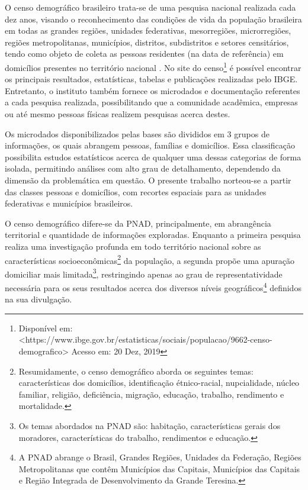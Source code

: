 O censo demográfico brasileiro trata-se de uma pesquisa nacional realizada cada dez anos, visando o reconhecimento das condições de vida da população brasileira em todas as grandes regiões, unidades federativas, mesorregiões, microrregiões, regiões metropolitanas, municípios, distritos, subdistritos e setores censitários, tendo como objeto de coleta as pessoas residentes (na data de referência) em domicílios presentes no território nacional \cite{cap04_ref14}. No site do censo\footnote{Disponível em: <https://www.ibge.gov.br/estatisticas/sociais/populacao/9662-censo-demografico> Acesso em: 20 Dez, 2019} é possível encontrar os principais resultados, estatísticas, tabelas e publicações realizadas pelo IBGE. Entretanto, o instituto também fornece os microdados e documentação referentes a cada pesquisa realizada, possibilitando que a comunidade acadêmica, empresas ou até mesmo pessoas físicas realizem pesquisas acerca destes. 

Os microdados disponibilizados pelas bases são divididos em 3 grupos de informações, os quais abrangem pessoas, famílias e domicílios. Essa classificação possibilita estudos estatísticos acerca de qualquer uma dessas categorias de forma isolada, permitindo análises com alto grau de detalhamento, dependendo da dimensão da problemática em questão. O presente trabalho norteou-se a partir das classes pessoas e domicílios, com recortes espaciais para as unidades federativas e municípios brasileiros. 

O censo demográfico difere-se da PNAD, principalmente, em abrangência territorial e quantidade de informações exploradas. Enquanto a primeira pesquisa realiza uma investigação profunda em todo território nacional sobre as características socioeconômicas\footnote{Resumidamente, o censo demográfico aborda os seguintes temas: características dos domicílios, identificação étnico-racial, nupcialidade, núcleo familiar, religião, deficiência, migração, educação, trabalho, rendimento e mortalidade.} da população, a segunda propõe uma apuração domiciliar mais limitada\footnote{Os temas abordados na PNAD são: habitação, características gerais dos moradores, características do trabalho, rendimentos e educação.}, restringindo apenas ao grau de representatividade necessária para os seus resultados acerca dos diversos níveis geográficos\footnote{A PNAD abrange o Brasil, Grandes Regiões, Unidades da Federação, Regiões Metropolitanas que contêm Municípios das Capitais, Municípios das Capitais e Região Integrada de Desenvolvimento da Grande Teresina.} definidos na sua divulgação.

